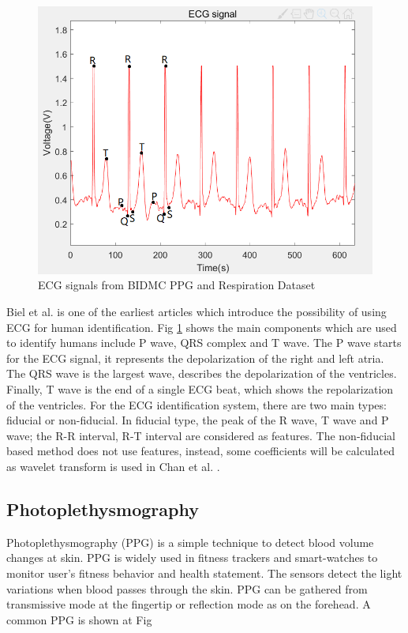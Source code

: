 \documentclass[a4paper,12pt]{article}
\begin{document}
\begin{figure}[H]
\centering
\includegraphics[width = .8\textwidth]{ecg.PNG}
\caption{ECG signals from BIDMC PPG and Respiration Dataset\autocite{PhysioNet}}
\label{fig:ecg}
\end{figure}

Biel et al.\autocite{Biel:2001ecg} is one of the earliest articles which introduce the possibility of using ECG for human identification. Fig \ref{fig:ecg} shows the main components which are used to identify humans include P wave, QRS complex and T wave. The P wave starts for the ECG signal, it represents the depolarization of the right and left atria\parencite{Agrafioti:2011heart}. The QRS wave is the largest wave, describes the depolarization of the ventricles\parencite{Wiki:ecg}. Finally, T wave is the end of a single ECG beat, which shows the repolarization of the ventricles\parencite{Lilly:2012pathophysiology}. For the ECG identification system, there are two main types: fiducial or non-fiducial\parencite{Agrafioti:2012secure}. In fiducial type, the peak of the R wave, T wave and P wave; the R-R interval, R-T interval are considered as features\parencite{Odinaka:2012analysis}. The non-fiducial based method does not use features, instead, some coefficients will be calculated as wavelet transform is used in Chan et al. \autocite{Chan2008wavelet}.

\subsection{Photoplethysmography}
Photoplethysmography (PPG) is a simple technique to detect blood volume changes at skin\parencite{Karimian:2017human}. PPG is widely used in fitness trackers and smart-watches to monitor user's fitness behavior and health statement. The sensors detect the light variations when blood passes through the skin\parencite{Blasco:2018feasibility}. PPG can be gathered from transmissive mode at the fingertip or reflection mode as on the forehead\parencite{wiki:ppg}. A common PPG is shown at Fig
\end{document}
